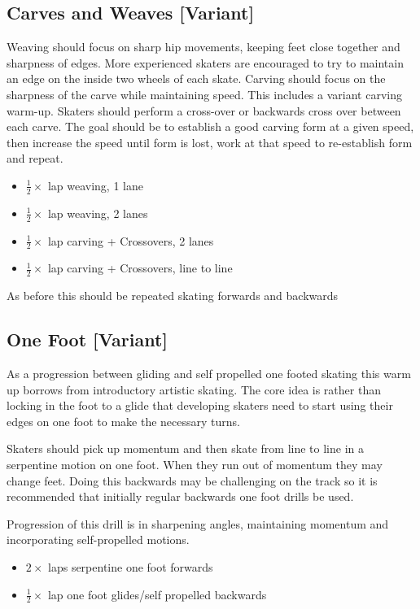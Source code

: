 \documentclass{journal}
\begin{document}
\subsection*{Carves and Weaves [Variant]}
\label{drill:sticky:carves_and_weaves}
Weaving should focus on sharp hip movements, keeping feet close together and sharpness of edges. More experienced skaters are encouraged to try to maintain an edge on the inside two wheels of each skate.     
Carving should focus on the sharpness of the carve while maintaining speed.
This includes a variant carving warm-up. 
Skaters should perform a cross-over or backwards cross over between each carve.
The goal should be to establish a good carving form at a given speed, then increase the speed until form is lost, work at that speed to re-establish form and repeat.

\begin{itemize}
    \item $\frac{1}{2}\times$ lap weaving, 1 lane 
    \item $\frac{1}{2}\times$ lap weaving, 2 lanes
    \item $\frac{1}{2}\times$ lap carving + Crossovers, 2 lanes 
    \item $\frac{1}{2}\times$ lap carving + Crossovers, line to line
\end{itemize}

As before this should be repeated skating forwards and backwards


\subsection*{One Foot [Variant]}
\label{drill:one_foot:serpentine}
As a progression between gliding and self propelled one footed skating this warm up borrows from introductory artistic skating.
The core idea is rather than locking in the foot to a glide that developing skaters need to start using their edges on one foot to make the necessary turns.     

Skaters should pick up momentum and then skate from line to line in a serpentine motion on one foot. When they run out of momentum they may change feet. Doing this backwards may be challenging on the track so it is recommended that initially regular backwards one foot drills be used. 

Progression of this drill is in sharpening angles, maintaining momentum and incorporating self-propelled motions.  
\begin{itemize}
    \item $2\times$ laps serpentine one foot forwards 
    \item $\frac{1}{2}\times$ lap one foot glides/self propelled backwards 
\end{itemize}
\end{document}
